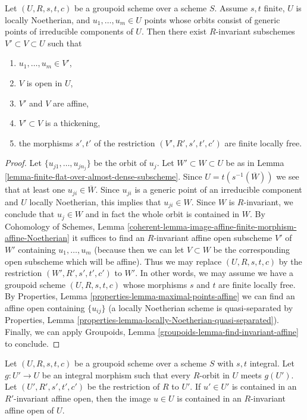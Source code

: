 \begin{lemma}
\label{lemma-invariant-affine-open-around-generic-point-Noetherian}
Let $(U, R, s, t, c)$ be a groupoid scheme over a scheme $S$.
Assume $s, t$ finite, $U$ is locally Noetherian, and $u_1, \ldots, u_m \in U$
points whose orbits consist of generic points of irreducible
components of $U$. Then there exist $R$-invariant subschemes
$V' \subset V \subset U$ such that
\begin{enumerate}
\item $u_1, \ldots, u_m \in V'$,
\item $V$ is open in $U$,
\item $V'$ and $V$ are affine,
\item $V' \subset V$ is a thickening,
\item the morphisms $s', t'$ of the restriction $(V', R', s', t', c')$
are finite locally free.
\end{enumerate}
\end{lemma}

\begin{proof}
Let $\{u_{j1}, \ldots, u_{jn_j}\}$ be the orbit of $u_j$.
Let $W' \subset W \subset U$ be as in
Lemma \ref{lemma-finite-flat-over-almost-dense-subscheme}.
Since $U = t(s^{-1}(\overline{W}))$ we see that at least
one $u_{ji} \in \overline{W}$. Since $u_{ji}$ is a generic point
of an irreducible component and $U$ locally Noetherian,
this implies that $u_{ji} \in W$. Since $W$ is $R$-invariant, we
conclude that $u_j \in W$ and in fact the whole orbit is contained in $W$.
By Cohomology of Schemes, Lemma
\ref{coherent-lemma-image-affine-finite-morphism-affine-Noetherian}
it suffices to find an $R$-invariant affine open subscheme $V'$
of $W'$ containing $u_1, \ldots, u_m$ (because then we can let $V \subset W$
be the corresponding open subscheme which will be affine).
Thus we may replace $(U, R, s, t, c)$
by the restriction $(W', R', s', t', c')$ to $W'$.
In other words, we may assume we have a groupoid scheme $(U, R, s, t, c)$
whose morphisms $s$ and $t$ are finite locally free.
By Properties, Lemma \ref{properties-lemma-maximal-points-affine}
we can find an affine open containing $\{u_{ij}\}$
(a locally Noetherian scheme is quasi-separated by
Properties, Lemma \ref{properties-lemma-locally-Noetherian-quasi-separated}).
Finally, we can apply
Groupoids, Lemma \ref{groupoids-lemma-find-invariant-affine}
to conclude.
\end{proof}

\begin{lemma}
\label{lemma-find-affine-integral}
Let $(U, R, s, t, c)$ be a groupoid scheme over a scheme $S$
with $s, t$ integral. Let $g : U' \to U$ be an integral morphism
such that every $R$-orbit in $U$ meets $g(U')$. Let $(U', R', s', t', c')$
be the restriction of $R$ to $U'$. If $u' \in U'$ is contained in an
$R'$-invariant affine open, then the image $u \in U$ is contained
in an $R$-invariant affine open of $U$.
\end{lemma}


